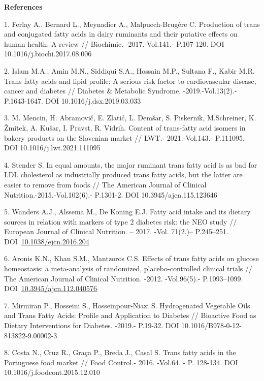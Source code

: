 \begin{center}
{\bfseries References}
\end{center}

\begin{references}
1. Ferlay A., Bernard L., Meynadier A., Malpuech-Brugère C. Production
of trans and conjugated fatty acids in dairy ruminants and their
putative effects on human health: A review // Biochimie.
-2017.-Vol.141.- P.107-120. DOI 10.1016/j.biochi.2017.08.006

2. Islam M.A., Amin M.N., Siddiqui S.A., Hossain M.P., Sultana F., Kabir
M.R. Trans fatty acids and lipid profile: A serious risk factor to
cardiovascular disease, cancer and diabetes // Diabetes \& Metabolic
Syndrome. -2019.-Vol.13(2).- P.1643-1647. DOI 10.1016/j.dsx.2019.03.033

3. M. Mencin, H. Abramovič, E. Zlatić, L. Demšar, S. Piskernik,
M.Schreiner, K. Žmitek, A. Kušar, I. Pravst, R. Vidrih. Content of
trans-fatty acid isomers in bakery products on the Slovenian market //
LWT.- 2021.-Vol.143.- P.111095. DOI 10.1016/j.lwt.2021.111095

4. Stender S. In equal amounts, the major ruminant trans fatty acid is
as bad for LDL cholesterol as industrially produced trans fatty acids,
but the latter are easier to remove from foods // The American Journal
of Clinical Nutrition.-2015.-Vol.102(6).- P.1301-2.
DOI 10.3945/ajcn.115.123646

5. Wanders A.J., Alssema M., De Koning E.J. Fatty acid intake and its
dietary sources in relation with markers of type 2 diabetes risk: the
NEO study // European Journal of Clinical Nutrition. -- 2017. -Vol.
71(2.)-- P.245--251.
DOI~\href{https://doi.org/10.1038/ejcn.2016.204}{10.1038/ejcn.2016.204}

6. Aronis K.N., Khan S.M., Mantzoros C.S. Effects of trans fatty acids
on glucose homeostasis: a meta-analysis of randomized,
placebo-controlled clinical trials // The American Journal of Clinical
Nutrition. -2012. -Vol.96(5).- P.1093--1099.
DOI~\href{https://doi.org/10.3945/ajcn.112.040576}{10.3945/ajcn.112.040576}

7. Mirmiran P., Hosseini S., Hosseinpour-Niazi S. Hydrogenated Vegetable
Oils and Trans Fatty Acids: Profile and Application to Diabetes //
Bioactive Food as Dietary Interventions for Diabetes. -2019.- P.19-32.
DOI 10.1016/B978-0-12-813822-9.00002-3

8. Costa N., Cruz R., Graça P., Breda J., Casal S. Trans fatty acids in
the Portuguese food market // Food Control.- 2016. -Vol.64. - P.
128-134. DOI 10.1016/j.foodcont.2015.12.010


\end{references}
